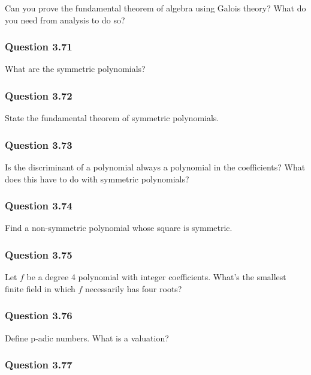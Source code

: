 Can you prove the fundamental theorem of algebra using Galois theory?
What do you need from analysis to do so?

\hypertarget{question-3.71}{%
\subsubsection{Question 3.71}\label{question-3.71}}

What are the symmetric polynomials?

\hypertarget{question-3.72}{%
\subsubsection{Question 3.72}\label{question-3.72}}

State the fundamental theorem of symmetric polynomials.

\hypertarget{question-3.73}{%
\subsubsection{Question 3.73}\label{question-3.73}}

Is the discriminant of a polynomial always a polynomial in the
coefficients? What does this have to do with symmetric polynomials?

\hypertarget{question-3.74}{%
\subsubsection{Question 3.74}\label{question-3.74}}

Find a non-symmetric polynomial whose square is symmetric.

\hypertarget{question-3.75}{%
\subsubsection{Question 3.75}\label{question-3.75}}

Let \(f\) be a degree 4 polynomial with integer coefficients. What's the
smallest finite field in which \(f\) necessarily has four roots?

\hypertarget{question-3.76}{%
\subsubsection{Question 3.76}\label{question-3.76}}

Define p-adic numbers. What is a valuation?

\hypertarget{question-3.77}{%
\subsubsection{Question 3.77}\label{question-3.77}}

